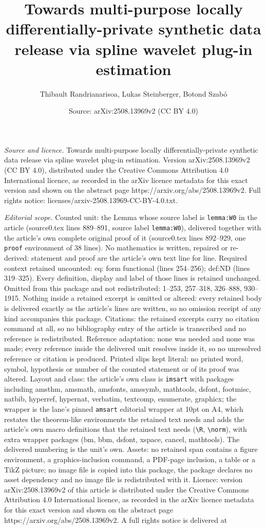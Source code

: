 \documentclass[10pt,a4paper]{amsart}
\title[Towards multi-purpose locally differentially-private synthet]{Towards multi-purpose locally differentially-private synthetic data release via spline wavelet plug-in estimation}
\author{Thibault Randrianarisoa, Lukas Steinberger, Botond Szab\'o}
\date{Source: arXiv:2508.13969v2 (CC BY 4.0)}
\begin{document}
\maketitle

\noindent\emph{Source and licence.} Towards multi-purpose locally differentially-private synthetic data release via spline wavelet plug-in estimation. Version arXiv:2508.13969v2 (CC BY 4.0), distributed under the Creative Commons Attribution 4.0 International licence, as recorded in the arXiv licence metadata for this exact version and shown on the abstract page https://arxiv.org/abs/2508.13969v2. Full rights notice: licenses/arxiv-2508.13969-CC-BY-4.0.txt.\par\smallskip

\noindent\textit{Editorial scope.} Counted unit: the Lemma whose source label is \texttt{lemma:W0} in the article (source0.tex lines 889--891, source label \texttt{lemma:W0}), delivered together with the article's own complete original proof of it (source0.tex lines 892--929, one \texttt{proof} environment of 38 lines). No mathematics is written, repaired or re-derived: statement and proof are the article's own text line for line. Required context retained uncounted: eq: form functional (lines 254--256); def:ND (lines 319--325). Every definition, display and label of those lines is retained unchanged. Omitted from this package and not redistributed: 1--253, 257--318, 326--888, 930--1915. Nothing inside a retained excerpt is omitted or altered: every retained body is delivered exactly as the article's lines are written, so no omission receipt of any kind accompanies this package. Citations: the retained excerpts carry no citation command at all, so no bibliography entry of the article is transcribed and no reference is redistributed. Reference adaptation: none was needed and none was made; every reference inside the delivered unit resolves inside it, so no unresolved reference or citation is produced. Printed slips kept literal: no printed word, symbol, hypothesis or number of the counted statement or of its proof was altered. Layout and class: the article's own class is \texttt{imsart} with packages including amsthm, amsmath, amsfonts, amssymb, mathtools, dsfont, footmisc, natbib, hyperref, hypernat, verbatim, textcomp, enumerate, graphicx; the wrapper is the lane's pinned \texttt{amsart} editorial wrapper at 10pt on A4, which restates the theorem-like environments the retained text needs and adds the article's own macro definitions that the retained text needs (\texttt{\textbackslash R}, \texttt{\textbackslash norm}), with extra wrapper packages (bm, bbm, dsfont, xspace, cancel, mathtools). The delivered numbering is the unit's own. Assets: no retained span contains a figure environment, a graphics-inclusion command, a PDF-page inclusion, a table or a TikZ picture; no image file is copied into this package, the package declares no asset dependency and no image file is redistributed with it. Licence: version arXiv:2508.13969v2 of this article is distributed under the Creative Commons Attribution 4.0 International licence, as recorded in the arXiv licence metadata for this exact version and shown on the abstract page https://arxiv.org/abs/2508.13969v2. A full rights notice is delivered at 
\end{document}
